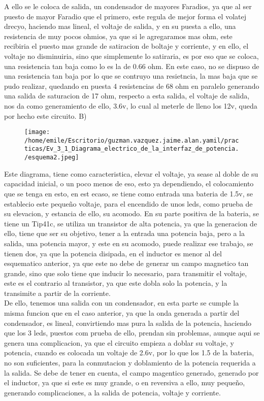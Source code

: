 \documentclass[11pt]{article}
\begin{document}
A ello se le coloca de salida, un condensador de mayores Faradios, ya que al ser puesto de mayor Faradio que el primero, este regula de mejor forma el volatej drecyo, haciendo mas lineal, el voltaje de salida, y en su puesta a ello, una resistencia de muy pocos ohmios, ya que si le agregaramos mas ohm, este recibiria el puesto mas grande de satiracion de boltaje y corriente, y en ello, el voltaje no disminuiria, sino que simplemente lo satiraria, es por eso que se coloca, una resistencia tan baja como lo es la de 0.66 ohm. En este caso, no se dispuso de una resistencia tan baja por lo que se contruyo una resietncia, la mas baja que se pudo realizar, quedando en puesta 4 resistencias de 68 ohm en paralelo generando una salida de saturacion de 17 ohm, respecto a esta salida, el voltaje de salida, nos da como generamiento de ello, 3.6v, lo cual al meterle de lleno los 12v, queda por hecho este circuito.
\newpage
B)\\

\begin{figure}[htp]
\centering
\texttt{[image: /home/emile/Escritorio/guzman.vazquez.jaime.alan.yamil/practicas/Ev\_3\_1\_Diagrama\_electrico\_de\_la\_interfaz\_de\_potencia./esquema2.jpeg]}
\caption{}
\label{}
\end{figure}

Este diagrama, tiene como caracteristica, elevar el voltaje, ya sease al doble de su capacidad inicial, o un poco menos de eso, esto ya dependiendo, el colocamiento que se tenga en esto, en est ecaso, se tiene como entrada una bateria de 1.5v, se establecio este pequeño voltaje, para el encendido de unos leds, como prueba de su elevacion, y estancia de ello, su acomodo. En su parte positiva de la bateria, se tiene un Tip41c, se utiliza un transistor de alta potencia, ya que la generacion de ello, tiene que ser su objetivo, tener a la entrada una potencia baja, pero a la salida, una potencia mayor, y este en su acomodo, puede realizar ese trabajo, se tienen dos, ya que la potencia disipada, en el inductor es menor al del esquematico anterior, ya que este no debe de generar un campo magnetico tan grande, sino que solo tiene que inducir lo necesario, para transmitir el voltaje, este es el contrario al transistor, ya que este dobla solo la potencia, y la transimite a partir de la corriente.\\

De ello, tenemos una salida con un condensador, en esta parte se cumple la misma funcion que en el caso anterior, ya que la onda generada a partir del condensador, es lineal, convirtiendo mas pura la salida de la potencia, haciendo que los 3 leds, puestos com prueba de ello, prendan sin problemas, aunque aqui se genera una complicacion, ya que el circuito empieza  a doblar su voltaje, y potencia, cuando es colocada un voltaje de 2.6v, por lo que los 1.5 de la bateria, no son suficientes, para la conmutacion y doblamiento de la potencia requerida a la salida. Se debe de tener en cuenta, el campo magentico generado, generado por el inductor, ya que si este es muy grande, o en reversiva a ello, muy pequeño, generando complicaciones, a la salida de potencia, voltaje y corriente.\\
\end{document}
